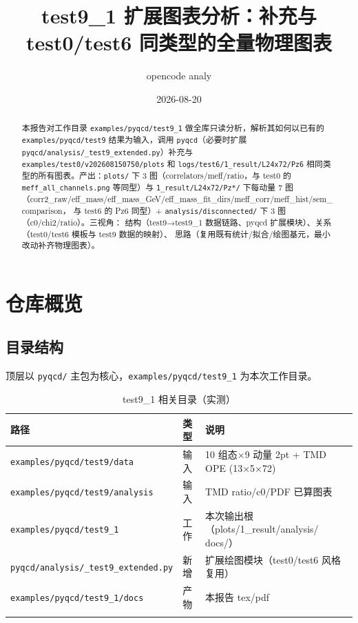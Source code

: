 \documentclass[UTF8]{ctexart}
\title{test9\_1 扩展图表分析：补充与 test0/test6 同类型的全量物理图表}
\author{opencode analy}
\date{2026-08-20}
\begin{document}
\maketitle
\sloppy

\begin{abstract}
本报告对工作目录 \texttt{examples/pyqcd/test9\_1} 做全库只读分析，解析其如何以已有的
\texttt{examples/pyqcd/test9} 结果为输入，调用 \texttt{pyqcd}（必要时扩展
\texttt{pyqcd/analysis/\_test9\_extended.py}）补充与
\texttt{examples/test0/v202608150750/plots} 和 \texttt{\nolinkurl{logs/test6/1\_result/L24x72/Pz6}}
相同类型的所有图表。产出：\texttt{plots/} 下 3 图（correlators/meff/ratio，与 test0 的
\texttt{\nolinkurl{meff\_all\_channels.png}} 等同型）与 \texttt{\nolinkurl{1\_result/L24x72/Pz*/}} 下每动量 7 图
（corr2\_raw/eff\_mass/eff\_mass\_GeV/eff\_mass\_fit\_dirs/meff\_corr/meff\_hist/sem\_comparison，
与 test6 的 Pz6 同型）+ \texttt{analysis/disconnected/} 下 3 图（c0/chi2/ratio）。三视角：
结构（test9→test9\_1 数据链路、pyqcd 扩展模块）、关系（test0/test6 模板与 test9 数据的映射）、
思路（复用既有统计/拟合/绘图基元，最小改动补齐物理图表）。
\end{abstract}

\tableofcontents

\section{仓库概览}
\subsection{目录结构}
顶层以 \texttt{pyqcd/} 主包为核心，\texttt{examples/pyqcd/test9\_1} 为本次工作目录。
\begin{xltabular}{\textwidth}{llX}
\toprule
\textcolor{struct}{路径} & 类型 & 说明 \\
\midrule
\endhead
\texttt{examples/pyqcd/test9/data} & 输入 & 10 组态×9 动量 2pt + TMD OPE (13×5×72) \\
\texttt{examples/pyqcd/test9/analysis} & 输入 & TMD ratio/c0/PDF 已算图表 \\
\texttt{examples/pyqcd/test9\_1} & 工作 & 本次输出根（plots/1\_result/analysis/ docs/） \\
\texttt{pyqcd/analysis/\_test9\_extended.py} & 新增 & 扩展绘图模块（test0/test6 风格复用） \\
\texttt{examples/pyqcd/test9\_1/docs} & 产物 & 本报告 tex/pdf \\
\bottomrule
\caption{test9\_1 相关目录（实测）}
\end{xltabular}
\end{document}
